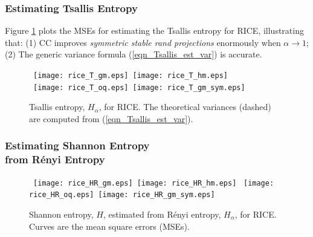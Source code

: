 \documentclass{sig-alternate}
\begin{document}
\vspace{0.2in}

\subsubsection{Estimating Tsallis Entropy}


Figure \ref{fig_rice_T} plots the MSEs for estimating the Tsallis entropy for RICE, illustrating that: (1) CC improves {\em symmetric stable rand projections} enormously when $\alpha\rightarrow 1$; (2) The generic variance formula (\ref{eqn_Tsallis_est_var}) is accurate.

\begin{figure}[h]
\begin{center}\mbox{
{\texttt{[image: rice\_T\_gm.eps]}} \hspace{-0.1in}
{\texttt{[image: rice\_T\_hm.eps]}}}\\\mbox{
{\texttt{[image: rice\_T\_oq.eps]}} \hspace{-0.1in}
{\texttt{[image: rice\_T\_gm\_sym.eps]}}
}
\end{center}
\vspace{-0.15in}
\caption{Tsallis entropy, $H_{\alpha}$, for RICE. The theoretical variances (dashed) are computed from (\ref{eqn_Tsallis_est_var}). }\label{fig_rice_T}
\end{figure}

\vspace{0.2in}
\subsubsection{Estimating Shannon Entropy\\ from R\'enyi Entropy}


\begin{figure}[h]
\begin{center}\mbox{
{\texttt{[image: rice\_HR\_gm.eps]}} \hspace{-0.1in}
{\texttt{[image: rice\_HR\_hm.eps]}}}\vspace{-0.1in}
\mbox{
{\texttt{[image: rice\_HR\_oq.eps]}} \hspace{-0.1in}
{\texttt{[image: rice\_HR\_gm\_sym.eps]}}\vspace{-0.1in}
}
\end{center}
\vspace{-0.25in}
\caption{Shannon entropy, $H$, estimated from R\'enyi entropy, $H_{\alpha}$, for RICE. Curves are the mean square errors (MSEs). }\label{fig_rice_HR}
\end{figure}
\end{document}
